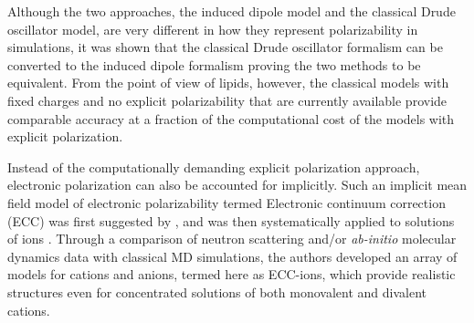 Although the two approaches, 
the induced dipole model and the classical Drude oscillator model, 
are very different in how they represent polarizability in simulations,
it was shown that the classical Drude oscillator formalism can be converted to the induced dipole formalism 
proving the two methods to be equivalent. \citep{huang2017mapping}
From the point of view of lipids, however, the classical models with fixed charges and no explicit polarizability that are currently available 
provide comparable accuracy at a fraction of the computational cost of the models with explicit polarization. \cite{lucas12,chowdhary13} 

Instead of the computationally demanding explicit polarization approach, 
electronic polarization can also be accounted for implicitly.
Such an implicit mean field model of electronic polarizability 
termed Electronic continuum correction (ECC) 
was first suggested by \citet{leontyev09}, 
and was then systematically applied to solutions of ions \citep{Pluharova2014, kohagen14, kohagen16, martinek17}. 
Through a comparison of neutron scattering and/or \emph{ab-initio} molecular dynamics data with classical MD simulations, 
the authors developed an array of models for cations and anions, termed here as ECC-ions,
which provide realistic structures even for concentrated solutions of both monovalent and divalent cations. 


